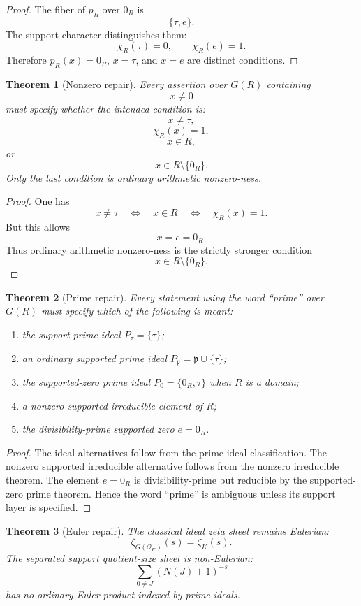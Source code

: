 \documentclass[11pt]{article}
\newtheorem{theorem}{Theorem}[section]
\begin{document}
\begin{proof}
The fiber of \(p_R\) over \(0_R\) is
\[
\{\tau,e\}.
\]
The support character distinguishes them:
\[
\chi_R(\tau)=0,
\qquad
\chi_R(e)=1.
\]
Therefore \(p_R(x)=0_R\), \(x=\tau\), and \(x=e\) are distinct conditions.
\end{proof}

\begin{theorem}[Nonzero repair]
Every assertion over \(G(R)\) containing
\[
x\neq0
\]
must specify whether the intended condition is:
\[
x\neq\tau,
\]
\[
\chi_R(x)=1,
\]
\[
x\in R,
\]
or
\[
x\in R\setminus\{0_R\}.
\]
Only the last condition is ordinary arithmetic nonzero-ness.
\end{theorem}

\begin{proof}
One has
\[
x\neq\tau
\quad\Longleftrightarrow\quad
x\in R
\quad\Longleftrightarrow\quad
\chi_R(x)=1.
\]
But this allows
\[
x=e=0_R.
\]
Thus ordinary arithmetic nonzero-ness is the strictly stronger condition
\[
x\in R\setminus\{0_R\}.
\]
\end{proof}

\begin{theorem}[Prime repair]
Every statement using the word ``prime'' over \(G(R)\) must specify which of the following is meant:
\begin{enumerate}[label=(\roman*)]
\item the support prime ideal \(P_\tau=\{\tau\}\);
\item an ordinary supported prime ideal \(P_{\mathfrak p}=\mathfrak p\cup\{\tau\}\);
\item the supported-zero prime ideal \(P_0=\{0_R,\tau\}\) when \(R\) is a domain;
\item a nonzero supported irreducible element of \(R\);
\item the divisibility-prime supported zero \(e=0_R\).
\end{enumerate}
\end{theorem}

\begin{proof}
The ideal alternatives follow from the prime ideal classification. The nonzero supported irreducible alternative follows from the nonzero irreducible theorem. The element \(e=0_R\) is divisibility-prime but reducible by the supported-zero prime theorem. Hence the word ``prime'' is ambiguous unless its support layer is specified.
\end{proof}

\begin{theorem}[Euler repair]
The classical ideal zeta sheet remains Eulerian:
\[
\zeta_{G(\mathcal O_K)}(s)=\zeta_K(s).
\]
The separated support quotient-size sheet is non-Eulerian:
\[
\sum_{0\neq J}(N(J)+1)^{-s}
\]
has no ordinary Euler product indexed by prime ideals.
\end{theorem}
\end{document}
